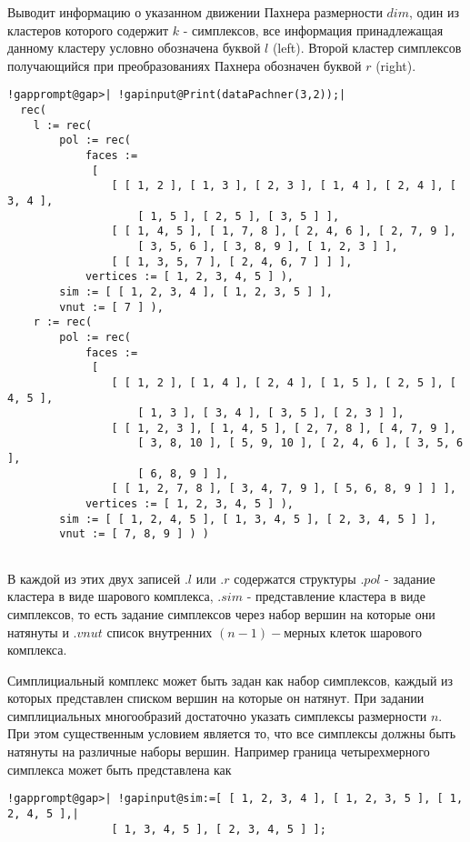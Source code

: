 \documentclass[a4paper,11pt]{report}
\begin{document}
{{{ Выводит
информацию
о
указанном
движении
Пахнера
размерности $dim$, один
из
кластеров
которого
содержит $k$ -
симплексов,
все
информация
принадлежащая
данному
кластеру
условно
обозначена
буквой $l$ (left).
Второй
кластер
симплексов
получающийся
при
преобразованиях
Пахнера
обозначен
буквой $r$ (right). 
\begin{Verbatim}[commandchars=!@|,fontsize=\small,frame=single,label=Example]
  !gapprompt@gap>| !gapinput@Print(dataPachner(3,2));|
  rec(
    l := rec(
        pol := rec(
            faces :=
             [
                [ [ 1, 2 ], [ 1, 3 ], [ 2, 3 ], [ 1, 4 ], [ 2, 4 ], [ 3, 4 ],
                    [ 1, 5 ], [ 2, 5 ], [ 3, 5 ] ],
                [ [ 1, 4, 5 ], [ 1, 7, 8 ], [ 2, 4, 6 ], [ 2, 7, 9 ],
                    [ 3, 5, 6 ], [ 3, 8, 9 ], [ 1, 2, 3 ] ],
                [ [ 1, 3, 5, 7 ], [ 2, 4, 6, 7 ] ] ],
            vertices := [ 1, 2, 3, 4, 5 ] ),
        sim := [ [ 1, 2, 3, 4 ], [ 1, 2, 3, 5 ] ],
        vnut := [ 7 ] ),
    r := rec(
        pol := rec(
            faces :=
             [
                [ [ 1, 2 ], [ 1, 4 ], [ 2, 4 ], [ 1, 5 ], [ 2, 5 ], [ 4, 5 ],
                    [ 1, 3 ], [ 3, 4 ], [ 3, 5 ], [ 2, 3 ] ],
                [ [ 1, 2, 3 ], [ 1, 4, 5 ], [ 2, 7, 8 ], [ 4, 7, 9 ],
                    [ 3, 8, 10 ], [ 5, 9, 10 ], [ 2, 4, 6 ], [ 3, 5, 6 ],
                    [ 6, 8, 9 ] ],
                [ [ 1, 2, 7, 8 ], [ 3, 4, 7, 9 ], [ 5, 6, 8, 9 ] ] ],
            vertices := [ 1, 2, 3, 4, 5 ] ),
        sim := [ [ 1, 2, 4, 5 ], [ 1, 3, 4, 5 ], [ 2, 3, 4, 5 ] ],
        vnut := [ 7, 8, 9 ] ) )
    						
\end{Verbatim}
 В
каждой
из
этих
двух
записей $.l$ или $.r$ содержатся
структуры $.pol$ -
задание
кластера
в виде
шарового
комплекса, $.sim$ -
представление
кластера
в виде
симплексов,
то
есть
задание
симплексов
через
набор
вершин
на
которые
они
натянуты
и $.vnut$ список
внутренних $(n-1)-$мерных
клеток
шарового
комплекса. }

 Симплициальный
комплекс
может
быть
задан
как
набор
симплексов,
каждый
из
которых
представлен
списком
вершин
на
которые
он
натянут.
При
задании
симплициальных
многообразий
достаточно
указать
симплексы
размерности $n.$ При
этом
существенным
условием
является
то, что
все
симплексы
должны
быть
натянуты
на
различные
наборы
вершин.
Например
граница
четырехмерного
симплекса
может
быть
представлена
как 
\begin{Verbatim}[commandchars=!@|,fontsize=\small,frame=single,label=Example]
  !gapprompt@gap>| !gapinput@sim:=[ [ 1, 2, 3, 4 ], [ 1, 2, 3, 5 ], [ 1, 2, 4, 5 ],|
  				[ 1, 3, 4, 5 ], [ 2, 3, 4, 5 ] ];
  				

\end{Verbatim}}}
\end{document}
